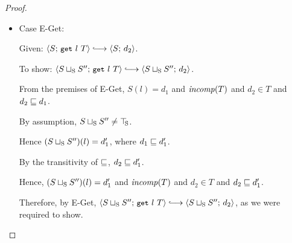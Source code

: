 \begin{proof}
\begin{itemize}
  \item Case {\sc E-Get}:

    Given: $\config{S}{\getexp{l}{T}} \parstepsto \config{S}{d_2}$.

    To show: $\config{\lubstore{S}{S''}}{\getexp{l}{T}} \parstepsto
    \config{\lubstore{S}{S''}}{d_2}$.

    From the premises of {\sc E-Get}, $S(l) = d_1$ and $\mathit{incomp}(T)$
    and $d_2 \in T$ and $d_2 \sqsubseteq d_1$.

    By assumption, $S \sqcup_{\mathrm{S}} S'' \neq \top\hspace{-0.85mm}_{\mathrm{S}}$.

    Hence $(S \sqcup_{\mathrm{S}} S'')(l) = d'_1$, where $d_1 \sqsubseteq d'_1$.

    By the transitivity of $\sqsubseteq$, $d_2 \sqsubseteq d'_1$.

    Hence, $(S \sqcup_{\mathrm{S}} S'')(l) = d'_1$ and $\mathit{incomp}(T)$ and $d_2
    \in T$ and $d_2 \sqsubseteq d'_1$.

    Therefore, by {\sc E-Get},
    $\config{\lubstore{S}{S''}}{\getexp{l}{T}} \parstepsto
    \config{\lubstore{S}{S''}}{d_2}$, as we were required to show.
  \end{itemize}
\end{proof}
